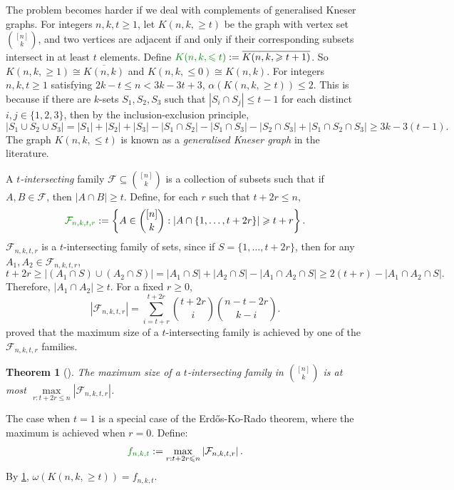 \documentclass[11pt]{article}
\numberwithin{equation}{section}
\theoremstyle{plain}
\newtheorem{thm}[equation]{Theorem}
\theoremstyle{definition}
\renewcommand{\geq}{\geqslant}
\renewcommand{\leq}{\leqslant}
\newcommand{\defn}[1]{\textcolor{green!50!black}{\textit{#1}}}
\newcommand{\mathdefn}[1]{\textcolor{green!50!black}{#1}}
\begin{document}
The problem becomes harder if we deal with complements of generalised Kneser graphs. For integers $n,k,t \geq 1$, let \defn{$K(n,k,\geq t)$} be the graph with vertex set $\binom{[n]}{k}$, and two vertices are adjacent if and only if their corresponding subsets intersect in at least $t$ elements. Define $\mathdefn{K(n,k, \leq t)}:= \overline{K(n,k, \geq t+1)}$. So $K(n,k, \geq 1) \cong \overline{K(n,k)}$ and $K(n,k,\leq 0) \cong K(n,k)$. For integers $n, k, t \geq 1$ satisfying $2k - t \leq n < 3k - 3t + 3$, $\alpha(K(n, k, \geq t)) \leq 2$.
This is because if there are $k$-sets $S_1, S_2, S_3$ such that $|S_i \cap S_j| \leq t - 1$ for each distinct $i,j \in \{1, 2, 3\}$, then by the inclusion-exclusion principle,
\begin{equation*}
    |S_1 \cup S_2 \cup S_3| = |S_1| + |S_2| + |S_3| - |S_1 \cap S_2| - |S_1 \cap S_3| - |S_2 \cap S_3| + |S_1 \cap S_2 \cap S_3| \geq 3k - 3(t-1).
\end{equation*}
The graph $K(n, k, \leq t)$ is known as a \defn{generalised Kneser graph} in the literature.

A \defn{$t$-intersecting} family $\mathcal{F} \subseteq \binom{[n]}{k}$ is a collection of subsets such that if $A, B \in \mathcal{F}$, then $\left|A \cap B\right| \geq t$. Define, for each $r$ such that $t + 2r \leq n$,
\begin{equation*}
    \mathdefn{\mathcal{F}_{n,k,t,r}} := \left\{ A \in \binom{[n]}{k}: \left|A \cap \{ 1, \dots, t+2r \}\right| \geq t+ r \right\}.
\end{equation*}
$\mathcal{F}_{n,k,t,r}$ is a $t$-intersecting family of sets, since if $S = \{1, \dots, t + 2r\}$, then for any $A_1, A_2 \in \mathcal{F}_{n,k,t,r}$,
\begin{equation*}
    t + 2r \geq |(A_1 \cap S) \cup (A_2 \cap S)| = |A_1 \cap S| + |A_2 \cap S| - |A_1 \cap A_2 \cap S| \geq 2(t+r) - |A_1 \cap A_2 \cap S|.
\end{equation*}
Therefore, $|A_1 \cap A_2| \geq t$. For a fixed $r \geq 0$,
\begin{equation}
    \left|\mathcal{F}_{n,k,t,r}\right| = \sum_{i=t+r}^{t+2r} \binom{t+2r}{i} \binom{n - t - 2r}{k - i}. \tag{1} \label{eq:frac}
\end{equation}
\citet{ahlswede1997complete} proved that the maximum size of a $t$-intersecting family is achieved by one of the $\mathcal{F}_{n,k,t,r}$ families.
\begin{thm}[\citet{ahlswede1997complete}]
    \label{thm:akt}
    The maximum size of a $t$-intersecting family in $\binom{[n]}{k}$ is at most
    $\max\limits_{r: t + 2r \leq n} \left|\mathcal{F}_{n,k,t,r}\right|$.
\end{thm}
The case when $t = 1$ is a special case of the Erd\H{o}s-Ko-Rado theorem, where the maximum is achieved when $r = 0$. Define:
\begin{equation*}
    \mathdefn{f_{n,k,t}}:= \max_{r: t + 2r \leq n} \left|\mathcal{F}_{n,k,t,r}\right|.
\end{equation*}
By \cref{thm:akt}, $\omega(K(n,k,\geq t)) = f_{n,k,t}$.
\end{document}
